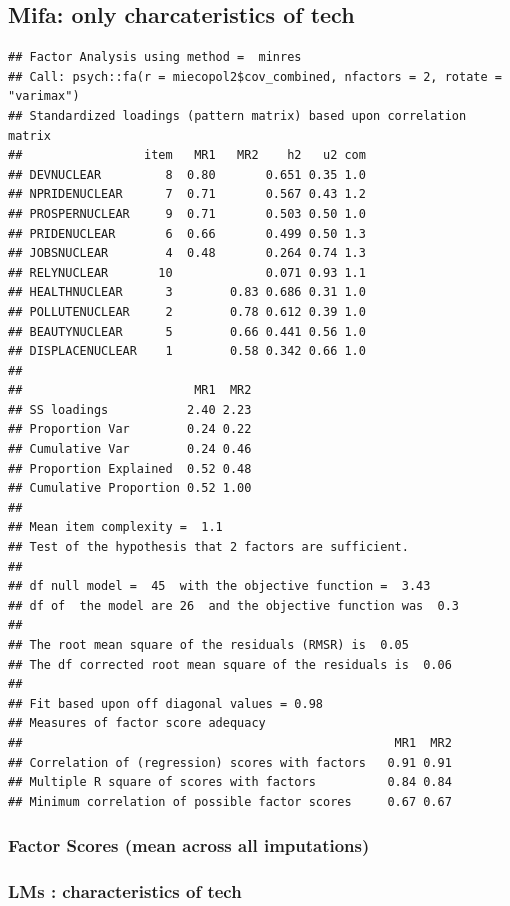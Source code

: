\documentclass[
]{article}
\begin{document}
\hypertarget{mifa-only-charcateristics-of-tech}{%
\subsection{Mifa: only charcateristics of
tech}\label{mifa-only-charcateristics-of-tech}}

\begin{verbatim}
## Factor Analysis using method =  minres
## Call: psych::fa(r = miecopol2$cov_combined, nfactors = 2, rotate = "varimax")
## Standardized loadings (pattern matrix) based upon correlation matrix
##                 item   MR1   MR2    h2   u2 com
## DEVNUCLEAR         8  0.80       0.651 0.35 1.0
## NPRIDENUCLEAR      7  0.71       0.567 0.43 1.2
## PROSPERNUCLEAR     9  0.71       0.503 0.50 1.0
## PRIDENUCLEAR       6  0.66       0.499 0.50 1.3
## JOBSNUCLEAR        4  0.48       0.264 0.74 1.3
## RELYNUCLEAR       10             0.071 0.93 1.1
## HEALTHNUCLEAR      3        0.83 0.686 0.31 1.0
## POLLUTENUCLEAR     2        0.78 0.612 0.39 1.0
## BEAUTYNUCLEAR      5        0.66 0.441 0.56 1.0
## DISPLACENUCLEAR    1        0.58 0.342 0.66 1.0
## 
##                        MR1  MR2
## SS loadings           2.40 2.23
## Proportion Var        0.24 0.22
## Cumulative Var        0.24 0.46
## Proportion Explained  0.52 0.48
## Cumulative Proportion 0.52 1.00
## 
## Mean item complexity =  1.1
## Test of the hypothesis that 2 factors are sufficient.
## 
## df null model =  45  with the objective function =  3.43
## df of  the model are 26  and the objective function was  0.3 
## 
## The root mean square of the residuals (RMSR) is  0.05 
## The df corrected root mean square of the residuals is  0.06 
## 
## Fit based upon off diagonal values = 0.98
## Measures of factor score adequacy             
##                                                    MR1  MR2
## Correlation of (regression) scores with factors   0.91 0.91
## Multiple R square of scores with factors          0.84 0.84
## Minimum correlation of possible factor scores     0.67 0.67
\end{verbatim}

\hypertarget{factor-scores-mean-across-all-imputations-1}{%
\subsubsection{Factor Scores (mean across all
imputations)}\label{factor-scores-mean-across-all-imputations-1}}

\hypertarget{lms-characteristics-of-tech}{%
\subsubsection{LMs : characteristics of
tech}\label{lms-characteristics-of-tech}}
\end{document}
